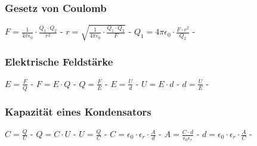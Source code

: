 \subsubsection{Gesetz von Coulomb} 
\begin{minipage}{0.45\textwidth} 
\end{minipage} 
\begin{minipage}{0.45\textwidth} 
 
\legende{}\end{minipage} 
 
$ F = \frac{ 1}{4\pi \epsilon _{0} } \cdot  \frac{Q_{1} \cdot Q_{2} }{  r^{2} } $ - $ r = \sqrt{\frac{  1}{4\pi \epsilon _{0} } \cdot  \frac{Q_{1} \cdot Q_{2} }{  F}} $ - $ Q_{1}  = 4\pi \epsilon _{0}  \cdot  \frac{F\cdot r^{2} }{ Q_{2} } $ - \\ 
 
\subsubsection{Elektrische Feldstärke} 
\begin{minipage}{0.45\textwidth} 
\end{minipage} 
\begin{minipage}{0.45\textwidth} 
 
\legende{}\end{minipage} 
 
$ E = \frac{F}{Q} $ - $ F = E\cdot Q $ - $ Q = \frac{F}{E} $ - $ E = \frac{U}{d} $ - $ U = E\cdot d $ - $ d = \frac{U}{E} $ - \\ 
 
\subsubsection{Kapazität eines Kondensators} 
\begin{minipage}{0.45\textwidth} 
\end{minipage} 
\begin{minipage}{0.45\textwidth} 
 
\legende{}\end{minipage} 
 
$ C = \frac{Q}{U} $ - $ Q = C\cdot U $ - $ U = \frac{Q}{C} $ - $ C = \epsilon _{0} \cdot \epsilon _{r} \cdot \frac{A}{d} $ - $ A = \frac{C\cdot d}{\epsilon _{0} \epsilon _{r} } $ - $ d = \epsilon _{0} \cdot \epsilon _{r} \cdot \frac{A}{C} $ - \\ 
 
